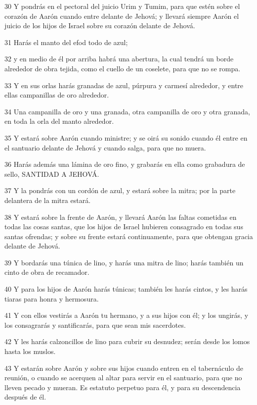 \par 30 Y pondrás en el pectoral del juicio Urim y Tumim,  para que estén sobre el corazón de Aarón cuando entre delante de Jehová; y llevará siempre Aarón el juicio de los hijos de Israel sobre su corazón delante de Jehová.
\par 31 Harás el manto del efod todo de azul;
\par 32 y en medio de él por arriba habrá una abertura, la cual tendrá un borde alrededor de obra tejida, como el cuello de un coselete, para que no se rompa.
\par 33 Y en sus orlas harás granadas de azul, púrpura y carmesí alrededor, y entre ellas campanillas de oro alrededor.
\par 34 Una campanilla de oro y una granada, otra campanilla de oro y otra granada, en toda la orla del manto alrededor.
\par 35 Y estará sobre Aarón cuando ministre; y se oirá su sonido cuando él entre en el santuario delante de Jehová y cuando salga, para que no muera.
\par 36 Harás además una lámina de oro fino, y grabarás en ella como grabadura de sello, SANTIDAD A JEHOVÁ.
\par 37 Y la pondrás con un cordón de azul, y estará sobre la mitra; por la parte delantera de la mitra estará.
\par 38 Y estará sobre la frente de Aarón, y llevará Aarón las faltas cometidas en todas las cosas santas, que los hijos de Israel hubieren consagrado en todas sus santas ofrendas; y sobre su frente estará continuamente, para que obtengan gracia delante de Jehová.
\par 39 Y bordarás una túnica de lino, y harás una mitra de lino; harás también un cinto de obra de recamador.
\par 40 Y para los hijos de Aarón harás túnicas; también les harás cintos, y les harás tiaras para honra y hermosura.
\par 41 Y con ellos vestirás a Aarón tu hermano, y a sus hijos con él; y los ungirás, y los consagrarás y santificarás, para que sean mis sacerdotes.
\par 42 Y les harás calzoncillos de lino para cubrir su desnudez; serán desde los lomos hasta los muslos.
\par 43 Y estarán sobre Aarón y sobre sus hijos cuando entren en el tabernáculo de reunión, o cuando se acerquen al altar para servir en el santuario, para que no lleven pecado y mueran. Es estatuto perpetuo para él, y para su descendencia después de él.

